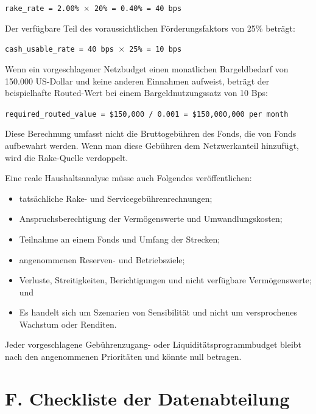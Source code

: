 \documentclass[11pt]{article}
\begin{document}
\texttt{rake\_rate = 2.00\% $\times$ 20\% = 0.40\% = 40 bps}

Der verfügbare Teil des voraussichtlichen Förderungsfaktors von 25\% beträgt:

\texttt{cash\_usable\_rate = 40 bps $\times$ 25\% = 10 bps}

Wenn ein vorgeschlagener Netzbudget einen monatlichen Bargeldbedarf von 150.000 US-Dollar und keine anderen Einnahmen aufweist, beträgt der beispielhafte Routed-Wert bei einem Bargeldnutzungssatz von 10 Bps:

\texttt{required\_routed\_value = \$150,000 / 0.001 = \$150,000,000 per month}

Diese Berechnung umfasst nicht die Bruttogebühren des Fonds, die von Fonds aufbewahrt werden. Wenn man diese Gebühren dem Netzwerkanteil hinzufügt, wird die Rake-Quelle verdoppelt.

Eine reale Haushaltsanalyse müsse auch Folgendes veröffentlichen:

\begin{itemize}[leftmargin=*]
\item tatsächliche Rake- und Servicegebührenrechnungen;
\item Anspruchsberechtigung der Vermögenswerte und Umwandlungskosten;
\item Teilnahme an einem Fonds und Umfang der Strecken;
\item angenommenen Reserven- und Betriebsziele;
\item Verluste, Streitigkeiten, Berichtigungen und nicht verfügbare Vermögenswerte; und
\item Es handelt sich um Szenarien von Sensibilität und nicht um versprochenes Wachstum oder Renditen.
\end{itemize}
Jeder vorgeschlagene Gebührenzugang- oder Liquiditätsprogrammbudget bleibt nach den angenommenen Prioritäten und könnte null betragen.


\section*{F. Checkliste der Datenabteilung}
\end{document}
